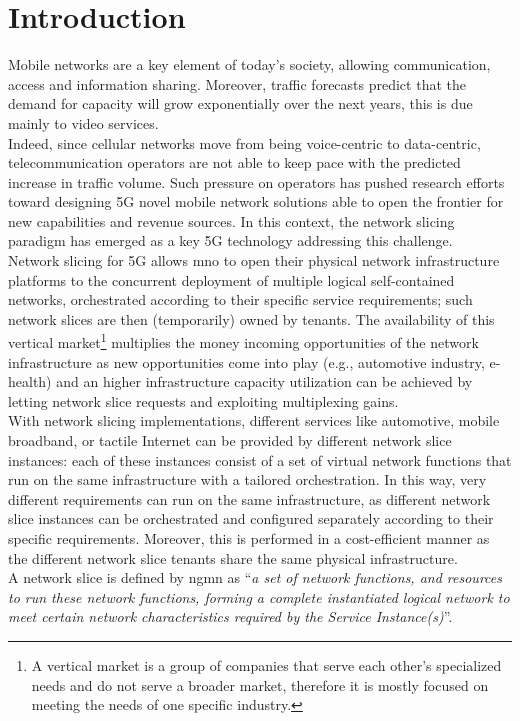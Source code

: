 \documentclass[a4paper,12pt]{report} %
\begin{document}
\section{Introduction}
Mobile networks are a key element of today's society, allowing communication, access
and information sharing. Moreover, traffic forecasts predict that the
demand for capacity will grow exponentially over the next years, this is due mainly to
video services.\\ 
Indeed, since cellular networks move from being voice-centric to
data-centric, telecommunication operators are not able to keep pace with the predicted
increase in traffic volume. Such pressure on operators has
pushed research efforts toward designing 5G novel mobile network solutions
able to open the frontier for new capabilities and revenue sources. In this context, the network
slicing paradigm has emerged as a key 5G technology addressing this challenge.\\
Network slicing for 5G allows \gls{mno} to open
their physical network infrastructure platforms to the concurrent deployment
of multiple logical self-contained networks, orchestrated according
to their specific service requirements; such network slices are then
(temporarily) owned by tenants. The availability of this vertical market\footnote{A vertical market is a group of companies that serve each other's specialized needs and do not serve a broader market, therefore it is mostly focused on meeting the needs of one specific industry.} multiplies
the money incoming opportunities of the network infrastructure as new
opportunities come into play (e.g., automotive industry, e-health) and an higher
infrastructure capacity utilization can be achieved by letting network slice
requests and exploiting multiplexing gains.\\
With network slicing implementations, different services like automotive,
mobile broadband, or tactile Internet can be provided by different network slice
instances: each of these instances consist of a set of virtual network functions
that run on the same infrastructure with a tailored orchestration. In this way,
very different requirements can run on the same infrastructure, as
different network slice instances can be orchestrated and configured separately
according to their specific requirements. Moreover, this is performed in a
cost-efficient manner as the different network slice tenants share the same
physical infrastructure.\\
A network slice is defined by \gls{ngmn} as “\textit{a set of network functions, and
resources to run these network functions, forming a complete instantiated
logical network to meet certain network characteristics required by the Service
Instance(s)}”.\\
\end{document}
